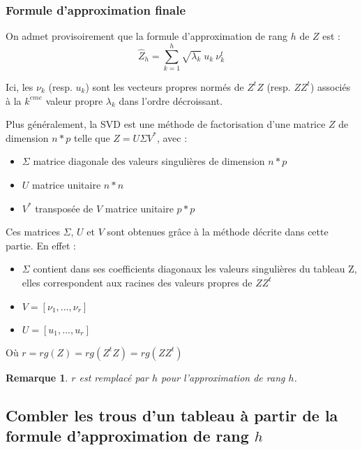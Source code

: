 \documentclass[12pt, openany, fleqn, french]{article}
\newtheorem*{remark}{Remarque}
\begin{document}
 \subsubsection{Formule d'approximation finale}

    On admet provisoirement que la formule d'approximation de rang $h$ de $Z$ est : 
    $$\hat{Z}_h = \sum_{k=1}^h \sqrt{\lambda_k}~u_k ~\nu_k^t$$
    
    Ici, les $\nu_k$ (resp. $u_k$) sont les vecteurs propres normés de $Z^tZ$ (resp. $ZZ^t$) associés à la $k^{ \grave{e}me}$ valeur propre $\lambda_k$ dans l'ordre décroissant. 

    Plus généralement, la SVD est une méthode de factorisation d'une matrice $Z$ de dimension $n*p$ telle que  
    $Z = U \Sigma V^*$, avec :
    \begin{itemize}
         \item $\Sigma$ matrice diagonale des valeurs singulières de dimension $n*p$ 
          \item $U$ matrice unitaire $n*n$
         \item $V^*$ transposée de $V$ matrice unitaire $p*p$ 
    \end{itemize} 

\hspace{2cm}

Ces matrices $\Sigma$, $U$ et $V$ sont obtenues grâce à la méthode décrite dans cette partie. En effet : 

\begin{itemize}
    \item $\Sigma$ contient dans ses coefficients diagonaux les valeurs singulières du tableau Z, elles correspondent aux racines des valeurs propres de $ZZ^t$
    \item $V = [\nu_1,...,\nu_r]$ 
    \item $U = [u_1,...,u_r]$
\end{itemize}

Où $r = rg(Z)= rg(Z^tZ)=rg(ZZ^t)$
\begin{remark}
   $r$ est remplacé par $h$ pour l'approximation de rang $h$. 
\end{remark}


\newpage

\subsection{Combler les trous d'un tableau à partir de la formule d'approximation de rang $h$}
\end{document}
